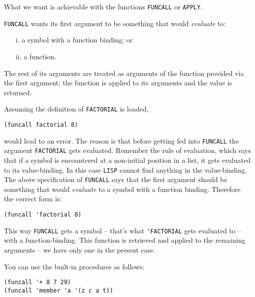 \documentclass[a4paper,11pt]{article}
\begin{document}
\begin{uenum}
\begin{uenumi}
\item What we want is achievable with the functions \Verb+FUNCALL+ or \Verb+APPLY+.

\item\label{funcallspec} \Verb+FUNCALL+ wants its first argument to be something that would \emph{evaluate} to:
\begin{itemize}
\item[i.] a symbol with a function binding; or 
\item[ii.] a function.
\end{itemize}
\item The rest of its arguments are treated as arguments of the function provided via the first argument; the function is applied to its arguments and the value is returned.


\begin{uenumi}

\item Assuming the definition of \Verb+FACTORIAL+ is loaded, 

\begin{ucodeframe}
\begin{Verbatim}
(funcall factorial 8)
\end{Verbatim}
\end{ucodeframe}
would lead to an error. The reason is that before getting fed into \Verb+FUNCALL+ the argument \Verb+FACTORIAL+ gets evaluated. Remember the rule of evaluation, which says that if a symbol is encountered at a non-initial position in a list, it gets evaluated to its value-binding. In this case \Verb+LISP+ cannot find anything in the value-binding. The above specification of \Verb+FUNCALL+ says that the first argument should be something that would \emph{evaluate} to a symbol with a function binding. Therefore the correct form is:

\begin{ucodeframe}
\begin{Verbatim}
(funcall 'factorial 8)
\end{Verbatim}
\end{ucodeframe}

This way \Verb+FUNCALL+ gets a symbol -- that's what \Verb+'FACTORIAL+ gets evaluated to -- with a function-binding. This function is retrieved and applied to the remaining arguments -- we have only one in the present case.

\item You can use the built-in procedures as follows:

\begin{ucodeframe}
\begin{Verbatim}
(funcall '+ 8 7 29)
(funcall 'member 'a '(z c a t))
\end{Verbatim}
\end{ucodeframe}


\end{uenumi}
\end{uenumi}
\end{uenum}
\end{document}
